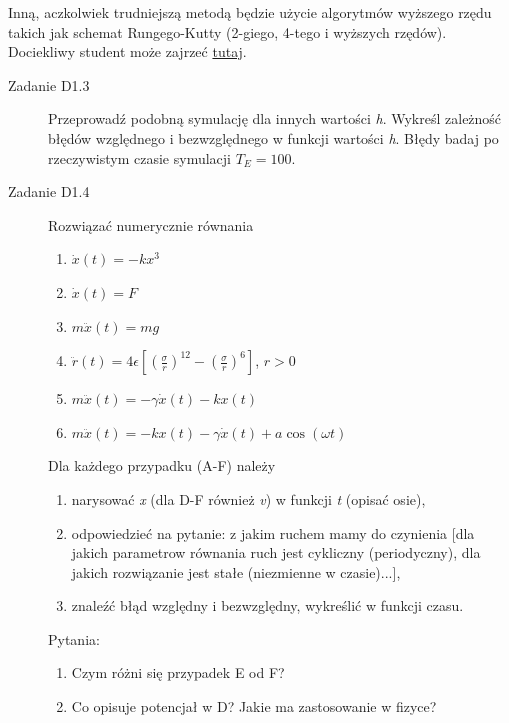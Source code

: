 \documentclass[a4paper,12pt,polish]{sphinxmanual}
\begin{document}
Inną, aczkolwiek trudniejszą metodą będzie użycie algorytmów wyższego rzędu takich jak schemat Rungego-Kutty
(2-giego, 4-tego i wyższych rzędów). Dociekliwy student może zajrzeć
\href{http://en.wikipedia.org/wiki/List\_of\_Runge\%E2\%80\%93Kutta\_methods}{tutaj}.
\begin{description}
\item[{Zadanie D1.3}] \leavevmode
Przeprowadź podobną symulację dla innych wartości \emph{h}. Wykreśl zależność błędów względnego i bezwzględnego
w funkcji wartości \emph{h}. Błędy badaj po rzeczywistym czasie symulacji $T_E = 100$.

\item[{Zadanie D1.4}] \leavevmode
Rozwiązać numerycznie równania
\begin{enumerate}
\item {} 
$\dot{x} (t) = -k x^3$

\item {} 
$\dot{x} (t) = F$

\item {} 
$m \ddot{x} (t) = m g$

\item {} 
$\ddot{r} (t) = 4 \epsilon \left[ \left(\frac{\sigma}{r} \right)^{12}-  \left( \frac{\sigma}{r}\right)^6 \right]$, $r>0$

\item {} 
$m \ddot{x} (t) = -\gamma \dot{x}(t) - k x(t)$

\item {} 
$m \ddot{x} (t) =  -k x(t) -\gamma \dot{x}(t) + a \cos(\omega t)$

\end{enumerate}

Dla każdego przypadku (A-F) należy
\begin{enumerate}
\item {} 
narysować \emph{x} (dla D-F również \emph{v}) w funkcji \emph{t} (opisać osie),

\item {} 
odpowiedzieć na pytanie: z jakim ruchem mamy do czynienia {[}dla jakich parametrow równania ruch
jest cykliczny (periodyczny), dla jakich rozwiązanie jest stałe (niezmienne w czasie)...{]},

\item {} 
znaleźć błąd względny i bezwzględny, wykreślić w funkcji czasu.

\end{enumerate}

Pytania:
\begin{enumerate}
\item {} 
Czym różni się przypadek E od F?

\item {} 
Co opisuje potencjał w D? Jakie ma zastosowanie w fizyce?

\end{enumerate}

\end{description}
\end{document}
